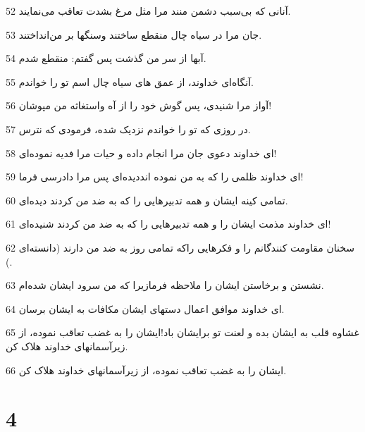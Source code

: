 \par 52 آنانی که بی‌سبب دشمن منند مرا مثل مرغ بشدت تعاقب می‌نمایند.
\par 53 جان مرا در سیاه چال منقطع ساختند وسنگها بر من‌انداختند.
\par 54 آبها از سر من گذشت پس گفتم: منقطع شدم.
\par 55 آنگاه‌ای خداوند، از عمق های سیاه چال اسم تو را خواندم.
\par 56 آواز مرا شنیدی، پس گوش خود را از آه واستغاثه من مپوشان!
\par 57 در روزی که تو را خواندم نزدیک شده، فرمودی که نترس.
\par 58 ‌ای خداوند دعوی جان مرا انجام داده و حیات مرا فدیه نموده‌ای!
\par 59 ‌ای خداوند ظلمی را که به من نموده انددیده‌ای پس مرا دادرسی فرما!
\par 60 تمامی کینه ایشان و همه تدبیرهایی را که به ضد من کردند دیده‌ای.
\par 61 ‌ای خداوند مذمت ایشان را و همه تدبیرهایی را که به ضد من کردند شنیده‌ای!
\par 62 سخنان مقاومت کنندگانم را و فکرهایی راکه تمامی روز به ضد من دارند (دانسته‌ای ).
\par 63 نشستن و برخاستن ایشان را ملاحظه فرمازیرا که من سرود ایشان شده‌ام.
\par 64 ‌ای خداوند موافق اعمال دستهای ایشان مکافات به ایشان برسان.
\par 65 غشاوه قلب به ایشان بده و لعنت تو برایشان باد!ایشان را به غضب تعاقب نموده، از زیرآسمانهای خداوند هلاک کن.
\par 66 ایشان را به غضب تعاقب نموده، از زیرآسمانهای خداوند هلاک کن.
 
\chapter{4}

